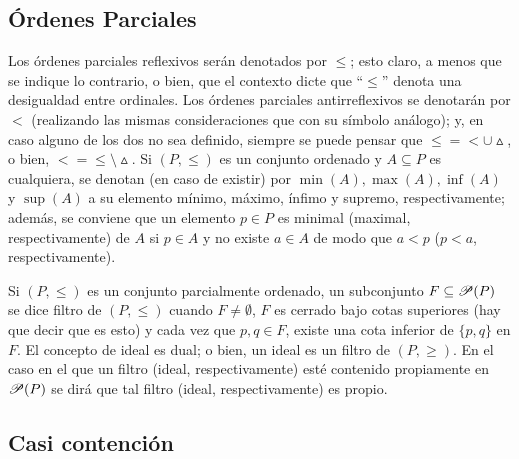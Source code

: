 \subsection{Órdenes Parciales}

Los órdenes parciales reflexivos serán denotados por $\leq$; esto claro, a menos que se indique lo contrario, o bien, que el contexto dicte que ``$\leq$'' denota una desigualdad entre ordinales. Los órdenes parciales antirreflexivos se denotarán por $<$ (realizando las mismas consideraciones que con su símbolo análogo); y, en caso alguno de los dos no sea definido, siempre se puede pensar que $ \leq = < \cup \vartriangle$, o bien, $< = \leq \setminus \vartriangle$. Si $(P,\leq)$ es un conjunto ordenado y $A \subseteq P$ es cualquiera, se denotan (en caso de existir) por $\min(A), \max(A), \inf(A)$ y $\sup(A)$ a su elemento mínimo, máximo, ínfimo y supremo, respectivamente; además, se conviene que un elemento $p \in P$ es minimal (maximal, respectivamente) de $A$ si $p \in A$ y no existe $a \in A$ de modo que $a<p$ ($p<a$, respectivamente).

Si $(P,\leq)$ es un conjunto parcialmente ordenado, un subconjunto $F \subseteq \mathscr{P}(P)$ se dice filtro de $(P,\leq)$ cuando $F \neq \emptyset$, $F$ es cerrado bajo cotas superiores (hay que decir que es esto) y cada vez que $p,q \in F$, existe una cota inferior de $\{p,q\}$ en $F$. El concepto de ideal es dual; o bien, un ideal es un filtro de $(P,\geq)$. En el caso en el que un filtro (ideal, respectivamente) esté contenido propiamente en $\mathscr{P}(P)$ se dirá que tal filtro (ideal, respectivamente) es propio.

\subsection{Casi contención}

